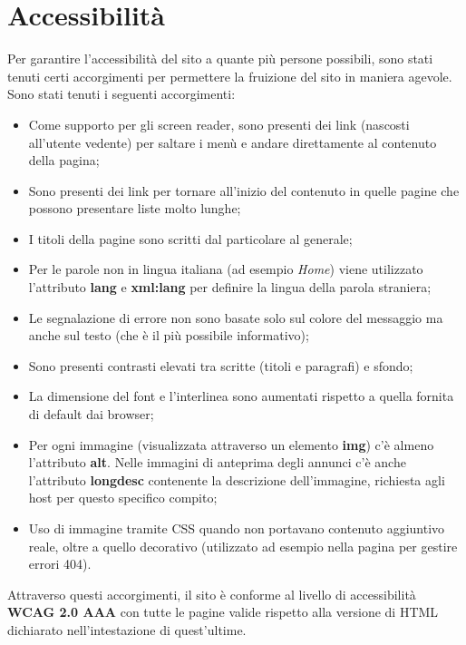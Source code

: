 \documentclass[1_relazione.tex]{subfiles}
\begin{document}
    \section{Accessibilit\`{a}}
    Per garantire l'accessibilità del sito a quante più persone possibili, sono stati tenuti certi accorgimenti per permettere la fruizione del sito in maniera agevole.
    Sono stati tenuti i seguenti accorgimenti:
    \begin{itemize}
        \item Come supporto per gli screen reader, sono presenti dei link (nascosti all'utente vedente) per saltare i men\`{u} e andare direttamente al contenuto della pagina;

        \item Sono presenti dei link per tornare all'inizio del contenuto in quelle pagine che possono presentare liste molto lunghe;

        \item I titoli della pagine sono scritti dal particolare al generale;

        \item Per le parole non in lingua italiana (ad esempio \textit{Home}) viene utilizzato l'attributo \textbf{lang} e \textbf{xml:lang} per definire la lingua della parola straniera;

        \item Le segnalazione di errore non sono basate solo sul colore del messaggio ma anche sul testo (che è il più possibile informativo);

        \item Sono presenti contrasti elevati tra scritte (titoli e paragrafi) e sfondo;

        \item La dimensione del font e l'interlinea sono aumentati rispetto a quella fornita di default dai browser;

        \item Per ogni immagine (visualizzata attraverso un elemento \textbf{img}) c'è almeno l'attributo \textbf{alt}.
        Nelle immagini di anteprima degli annunci c'è anche l'attributo \textbf{longdesc} contenente la descrizione dell'immagine, richiesta agli host per questo specifico compito;

        \item Uso di immagine tramite CSS quando non portavano contenuto aggiuntivo reale, oltre a quello decorativo (utilizzato ad esempio nella pagina per gestire errori 404).

    \end{itemize}
    Attraverso questi accorgimenti, il sito \`{e} conforme al livello di accessibilit\`{a} \textbf{WCAG 2.0 AAA} con tutte le pagine valide rispetto alla versione di HTML dichiarato nell'intestazione di quest'ultime.
\end{document}
